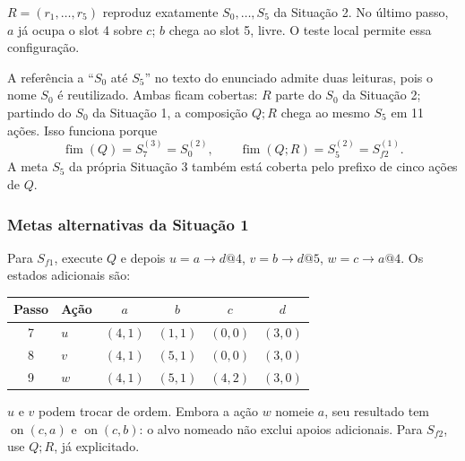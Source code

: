 \documentclass[11pt,a4paper]{article}
\newcommand{\On}{\operatorname{on}}
\begin{document}
$R=(r_1,\ldots,r_5)$ reproduz exatamente $S_0,\ldots,S_5$ da Situação 2. No último passo, $a$ já ocupa o slot 4 sobre $c$; $b$ chega ao slot 5, livre. O teste local permite essa configuração.

A referência a ``$S_0$ até $S_5$'' no texto do enunciado admite duas leituras, pois o nome $S_0$ é reutilizado. Ambas ficam cobertas: $R$ parte do $S_0$ da Situação 2; partindo do $S_0$ da Situação 1, a composição $Q;R$ chega ao mesmo $S_5$ em 11 ações. Isso funciona porque
\[
\operatorname{fim}(Q)=S_7^{(3)}=S_0^{(2)},\qquad
\operatorname{fim}(Q;R)=S_5^{(2)}=S_{f2}^{(1)}.
\]
A meta $S_5$ da própria Situação 3 também está coberta pelo prefixo de cinco ações de $Q$.

\subsubsection{Metas alternativas da Situação 1}
Para $S_{f1}$, execute $Q$ e depois $u=a\to d@4$, $v=b\to d@5$, $w=c\to a@4$. Os estados adicionais são:
\begin{center}\small
\begin{tabular}{@{}clcccc@{}}\toprule Passo & Ação & $a$ & $b$ & $c$ & $d$\\\midrule
7 & $u$ & $(4,1)$ & $(1,1)$ & $(0,0)$ & $(3,0)$\\
8 & $v$ & $(4,1)$ & $(5,1)$ & $(0,0)$ & $(3,0)$\\
9 & $w$ & $(4,1)$ & $(5,1)$ & $(4,2)$ & $(3,0)$\\\bottomrule
\end{tabular}\end{center}
$u$ e $v$ podem trocar de ordem. Embora a ação $w$ nomeie $a$, seu resultado tem $\On(c,a)$ e $\On(c,b)$: o alvo nomeado não exclui apoios adicionais. Para $S_{f2}$, use $Q;R$, já explicitado.
\end{document}
